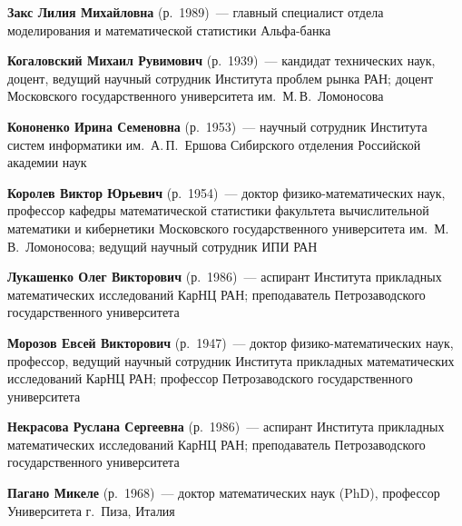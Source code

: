 \begin{multicols}{2}
\vspace*{4pt}

\noindent
\textbf{Закс Лилия Михайловна} (р.\ 1989)~--- главный специалист отдела 
моделирования и математической статистики Аль\-фа-банка

\vspace*{4pt}

\noindent
\textbf{Когаловский Михаил Рувимович} (р.\ 1939)~--- кандидат технических
наук, доцент, ведущий научный сотрудник Института проблем рынка РАН;
доцент Московского государственного университета им.\ М.\,В.~Ломоносова

\vspace*{4pt}

\noindent
\textbf{Кононенко Ирина Семеновна} (р.\ 1953)~--- научный сотрудник Института сис\-тем 
информатики им.\ А.\,П.~Ершова Сибирского отделения Российской академии наук

\columnbreak


\noindent
\textbf{Королев Виктор Юрьевич} (р.\ 1954)~--- доктор фи\-зи\-ко-ма\-те\-ма\-ти\-че\-ских наук, 
профессор кафедры математической статистики факультета вычислительной математики и кибернетики 
Московского государ\-ст\-вен\-но\-го университета им.\ М.\,В.~Ломоносова; 
ведущий научный сотрудник ИПИ РАН

\vspace*{4pt}


\noindent
\textbf{Лукашенко Олег Викторович} (р.\ 1986)~--- аспирант Института прикладных математических исследований
КарНЦ РАН; преподаватель Петрозаводского государственного университета

\vspace*{4pt}

\noindent
\textbf{Морозов Евсей Викторович} (р.\ 1947)~--- 
доктор фи\-зи\-ко-ма\-те\-ма\-ти\-че\-ских  наук, профессор,
ведущий научный сотрудник  Института прикладных математических исследований
КарНЦ РАН; профессор Петрозаводского государственного университета

\vspace*{4pt}

\noindent
\textbf{Некрасова Руслана Сергеевна} (р.\ 1986)~--- аспирант Института прикладных 
математических исследований КарНЦ РАН; преподаватель Петрозаводского государственного университета

\vspace*{4pt}

\noindent
\textbf{Пагано Микеле} (р.\ 1968)~--- доктор математических наук (PhD), профессор 
Университета г.\ Пиза, Италия


\end{multicols}
